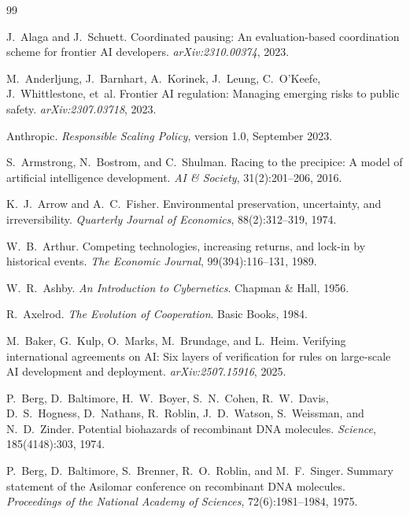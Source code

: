 \documentclass[11pt]{article}
\theoremstyle{plain}
\theoremstyle{definition}
\begin{document}
\begin{thebibliography}{99}\setlength{\itemsep}{1pt}\small

 J.~Alaga and J.~Schuett. Coordinated pausing: An evaluation-based coordination scheme for frontier AI developers. \emph{arXiv:2310.00374}, 2023.

 M.~Anderljung, J.~Barnhart, A.~Korinek, J.~Leung, C.~O'Keefe, J.~Whittlestone, et~al. Frontier AI regulation: Managing emerging risks to public safety. \emph{arXiv:2307.03718}, 2023.

 Anthropic. \emph{Responsible Scaling Policy}, version 1.0, September 2023.

 S.~Armstrong, N.~Bostrom, and C.~Shulman. Racing to the precipice: A model of artificial intelligence development. \emph{AI \& Society}, 31(2):201--206, 2016.

 K.~J.~Arrow and A.~C.~Fisher. Environmental preservation, uncertainty, and irreversibility. \emph{Quarterly Journal of Economics}, 88(2):312--319, 1974.

 W.~B.~Arthur. Competing technologies, increasing returns, and lock-in by historical events. \emph{The Economic Journal}, 99(394):116--131, 1989.

 W.~R.~Ashby. \emph{An Introduction to Cybernetics}. Chapman \& Hall, 1956.

 R.~Axelrod. \emph{The Evolution of Cooperation}. Basic Books, 1984.

 M.~Baker, G.~Kulp, O.~Marks, M.~Brundage, and L.~Heim. Verifying international agreements on AI: Six layers of verification for rules on large-scale AI development and deployment. \emph{arXiv:2507.15916}, 2025.

 P.~Berg, D.~Baltimore, H.~W.~Boyer, S.~N.~Cohen, R.~W.~Davis, D.~S.~Hogness, D.~Nathans, R.~Roblin, J.~D.~Watson, S.~Weissman, and N.~D.~Zinder. Potential biohazards of recombinant DNA molecules. \emph{Science}, 185(4148):303, 1974.

 P.~Berg, D.~Baltimore, S.~Brenner, R.~O.~Roblin, and M.~F.~Singer. Summary statement of the Asilomar conference on recombinant DNA molecules. \emph{Proceedings of the National Academy of Sciences}, 72(6):1981--1984, 1975.


\end{thebibliography}
\end{document}
